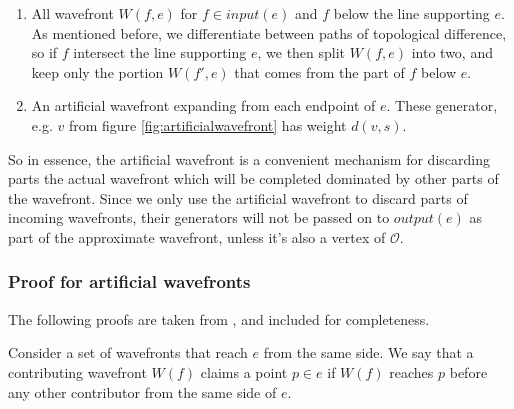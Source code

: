 \begin{enumerate}
\item All wavefront $W(f,e)$ for $f \in input(e)$ and $f$ below the line supporting $e$. As 
mentioned before, we differentiate between paths of topological difference, so if $f$ 
intersect the line supporting $e$, we then split $W(f,e)$ into two, and keep only the portion 
$W(f',e)$ that comes from the part of $f$ below $e$.
\item An artificial wavefront expanding from each endpoint of $e$. These generator, e.g. $v$ 
from figure \ref{fig:artificialwavefront} has weight $d(v,s)$.
\end{enumerate}

So in essence, the artificial wavefront is a convenient mechanism for discarding parts the 
actual wavefront which will be completed dominated by other parts of the wavefront. Since we 
only use the artificial wavefront to discard parts of incoming wavefronts, their generators 
will not be passed on to $output(e)$ as part of the approximate wavefront, unless it's also a 
vertex of $\mathcal{O}$.


\subsubsection{Proof for artificial wavefronts}

The following proofs are taken from \cite{HershbergerS99}, and included for completeness.

Consider a set of wavefronts that reach $e$ from the same side. We say that a
contributing wavefront $W(f)$  claims a point $p \in e$ if $W(f)$ reaches $p$
before any other contributor from the same side of $e$.

